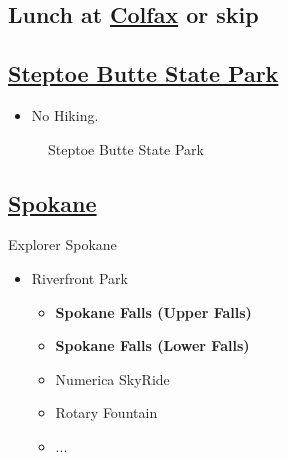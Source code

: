 \documentclass{article}
\newcommand{\SteptoeButteStatePark}{\href{https://maps.app.goo.gl/6vj1gx25XB5dEsUW8}{Steptoe Butte State Park}}
\newcommand{\Spokane}{\href{https://google.com}{Spokane}}
\begin{document}
\subsection{Lunch at \href{https://maps.app.goo.gl/bh54WPhsrkuKu8Ae8}{Colfax} or skip}

\subsection{\SteptoeButteStatePark}
\begin{itemize}
  \item{No Hiking.}
\end{itemize}

  \begin{figure}[H]
    \centering
    \caption{Steptoe Butte State Park}
  \end{figure}

\subsection{\Spokane}
Explorer Spokane
\begin{itemize}
  \item{Riverfront Park}
  \begin{itemize}
    \item{\textbf{Spokane Falls (Upper Falls)}}
    \item{\textbf{Spokane Falls (Lower Falls)}}
    \item{Numerica SkyRide}
    \item{Rotary Fountain}
    \item{...}
  \end{itemize}
\end{itemize}
\end{document}
